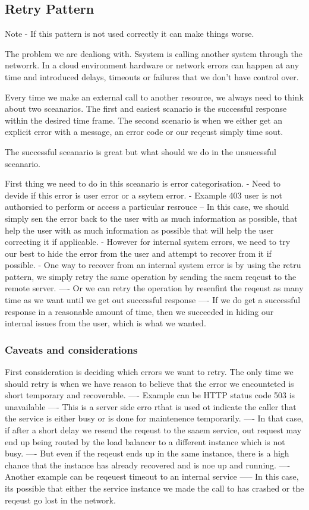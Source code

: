 \documentclass[a4paper, 11pt]{book}
\begin{document}
{    \subsection{Retry Pattern}
    Note - If this pattern is not used correctly it can make things worse.

    The problem we are dealiong with.
    Ssystem is calling another system through the networrk.
    In a cloud environment hardware or network errors can happen at any time and introduced delays, timeouts or failures that we don't have control over.

    Every time we make an external call to another resource, we always need to think about two sceanarios.
    The first and easiest scanario is the successful response within the desired time frame.
    The second scenario is when we either get an explicit error with a message, an error code or our reqeust simply time sout.

    The successful sceanario is great but what should we do in the unsucessful sceanario.

    First thing we need to do in this sceanario is error categorisation.
    - Need to devide if this error is user error or a ssytem error.
    - Example 403 user is not authorsied to perform or access a particular resrouce
    -- In this case, we should simply sen the error back to the user with as much information as possible, that help the user with as much information as possible that will help the user correcting it if applicable.
    - However for internal system errors, we need to try our best to hide the error from the user and attempt to recover from it if possible.
    - One way to recover from an internal system error is by using the retru pattern, we simply retry the same operation by sending the saem reqeust to the remote server.
    ---- Or we can retry the operation by resenfint the reqeust as many time as we want until we get out successful response
    ---- If we do get a successful response in a reasonable amount of time, then we succeeded in hiding our internal issues from the user, which is what we wanted.

    \subsubsection{Caveats and considerations}
    First consideration is deciding which errors we want to retry.
    The only time we should retry is when we have reason to believe that the error we encounteted is short temporary and recoverable.
    ---- Example can be HTTP status code 503 is unavailable
    ---- This is a server side erro rthat is used ot indicate the caller that the service is either busy or is done for maintenence temporarily.
    ---- In that case, if after a short delay we resend the reqeust to the saaem service, out request may end up being routed by the load balancer to a different instance which is not busy.
    ---- But even if the reqeust ends up in the same instance, there is a high chance that the instance has already recovered and is noe up and running.
    ---- Another example can be reqeuest timeout to an internal service
    ----- In this case, its possible that either the service instance we made the call to has crashed or the reqeust go lost in the network.

}
\end{document}
